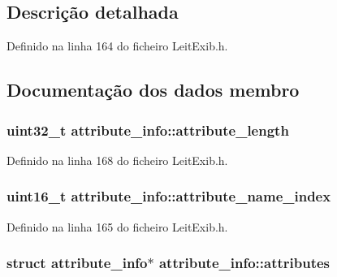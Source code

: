 \subsection{Descrição detalhada}


Definido na linha 164 do ficheiro Leit\-Exib.\-h.



\subsection{Documentação dos dados membro}
\hypertarget{structattribute__info_a05bf4c6510e85d1adb7d75c2742b8550}{
\subsubsection[{attribute\-\_\-length}]{\setlength{\rightskip}{0pt plus 5cm}uint32\-\_\-t attribute\-\_\-info\-::attribute\-\_\-length}}\label{structattribute__info_a05bf4c6510e85d1adb7d75c2742b8550}


Definido na linha 168 do ficheiro Leit\-Exib.\-h.

\hypertarget{structattribute__info_aa8d580cb4c1e585270a11167bfdec6ff}{
\subsubsection[{attribute\-\_\-name\-\_\-index}]{\setlength{\rightskip}{0pt plus 5cm}uint16\-\_\-t attribute\-\_\-info\-::attribute\-\_\-name\-\_\-index}}\label{structattribute__info_aa8d580cb4c1e585270a11167bfdec6ff}


Definido na linha 165 do ficheiro Leit\-Exib.\-h.

\hypertarget{structattribute__info_a405932cba2703fbf2ddc6487e3945108}{
\subsubsection[{attributes}]{\setlength{\rightskip}{0pt plus 5cm}struct {\bf attribute\-\_\-info}$\ast$ attribute\-\_\-info\-::attributes}}\label{structattribute__info_a405932cba2703fbf2ddc6487e3945108}



